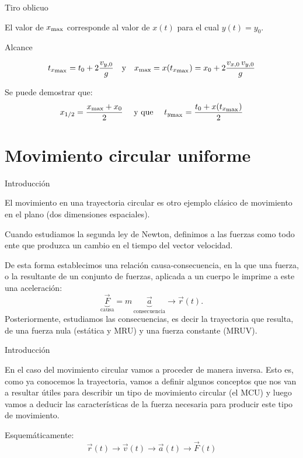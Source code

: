 \documentclass[11pt,handout,aspectratio=1610]{beamer}
\newcommand{\vs}{\vspace{11pt}}
\begin{document}
\begin{frame}{Tiro oblicuo}

    El valor de $x_{\text{\scriptsize max}}$ corresponde al valor de $x (t)$ para el cual $y(t) = y_0$.
 
    \begin{block}{Alcance}

        \vspace{-0.3cm}

        $$ t_{x_\text{\scriptsize max}} = t_0 + 2 \frac{v_{y,0}}{g} \quad \text{y} \quad x_\text{\scriptsize max} = x(t_{x_\text{\scriptsize max}}) = x_0 + 2 \frac{v_{x,0} \, v_{y,0}}{g}$$
    \end{block}

    Se puede demostrar que: $$x_{1/2} = \frac{x_\text{\scriptsize max} + x_0}{2} \quad \text{ y que } \quad t_{y_\text{\scriptsize max}} = \frac{t_0 + x(t_{x_\text{\scriptsize max}})}{2}$$
 
\end{frame}

\section{Movimiento circular uniforme}

\begin{frame}{Introducción}
    
    El movimiento en una trayectoria circular es otro ejemplo clásico de movimiento en el plano (dos dimensiones espaciales).

    \vs

    Cuando estudiamos la segunda ley de Newton, definimos a las fuerzas como todo ente que produzca un cambio en el tiempo del vector velocidad.

    \vs

    De esta forma establecimos una relación causa-consecuencia, en la que una fuerza, o la resultante de un conjunto de fuerzas, aplicada a un cuerpo le imprime a este una aceleración: $$ \underbrace{\vec{F}}_{\text{causa}}  = m \, \underbrace{\vec{a}}_{\text{consecuencia}} \rightarrow \vec{r} (t). $$ Posteriormente, estudiamos las consecuencias, es decir la trayectoria que resulta, de una fuerza nula (estática y MRU) y una fuerza constante (MRUV).

\end{frame}

\begin{frame}{Introducción}

    En el caso del movimiento circular vamos a proceder de manera inversa. Esto es, como ya conocemos la trayectoria, vamos a definir algunos conceptos que nos van a resultar útiles para describir un tipo de movimiento circular (el MCU) y luego vamos a deducir las características de la fuerza necesaria para producir este tipo de movimiento.

    \vs 

    Esquemáticamente: $$ \vec{r} (t) \rightarrow \vec{v} (t) \rightarrow \vec{a} (t) \rightarrow \vec{F} (t) $$

\end{frame}
\end{document}
